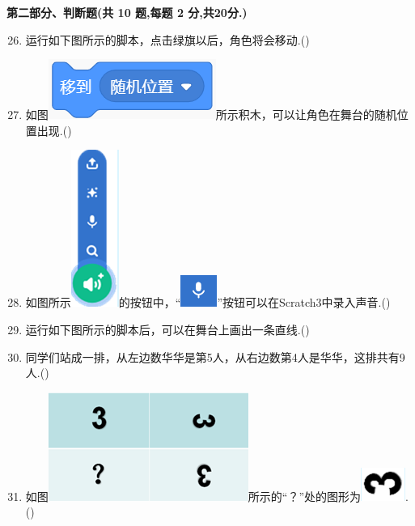 \documentclass[10pt, a4paper]{article}
\begin{document}
    \newpage
    {\noindent\textbf{第二部分、判断题(共 10 题,每题 2 分,共20分.)}}
    \begin{enumerate}
        \setcounter{enumi}{25}
        \item 运行如下图所示的脚本，点击绿旗以后，角色将会移动.(\qquad)

        \item 如图\includegraphics[width=.12\textwidth]{27.png}所示积木，可以让角色在舞台的随机位置出现.(\qquad)
        
        \item 如图所示\includegraphics[width=.03\textwidth]{28.png}的按钮中，“\includegraphics[width=.02\textwidth]{28-2.png}”按钮可以在Scratch3中录入声音.(\qquad)
  
        \item 运行如下图所示的脚本后，可以在舞台上画出一条直线.(\qquad)
        
        \item 同学们站成一排，从左边数华华是第5人，从右边数第4人是华华，这排共有9人.(\qquad)
        
        \item 如图\includegraphics[width=.1\textwidth]{31-2.png}所示的“？”处的图形为\includegraphics[width=.02\textwidth]{31-1.png}.(\qquad)
        

\end{enumerate}
\end{document}
